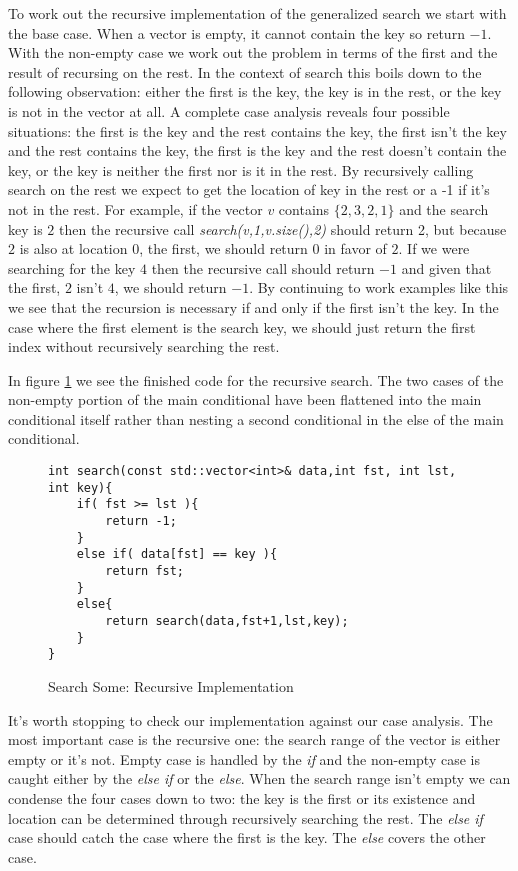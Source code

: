 \documentclass[]{tufte-handout}
\begin{document}
To work out the recursive implementation of the generalized search we start with the base case. When a vector is empty, it cannot contain the key so return $-1$. With the non-empty case we work out the problem in terms of the first and the result of recursing on the rest. In the context of search this boils down to the following observation: either the first is the key, the key is in the rest, or the key is not in the vector at all. A complete case analysis reveals four possible situations: the first is the key and the rest contains the key, the first isn't the key and the rest contains the key, the first is the key and the rest doesn't contain the key, or the key is neither the first nor is it in the rest. By recursively calling search on the rest we expect to get the location of key in the rest or a -1 if it's not in the rest.  For example, if the vector $v$ contains $\{2,3,2,1\}$ and the search key is $2$ then the recursive call \textit{search(v,1,v.size(),2)} should return 2, but because $2$ is also at location $0$, the first, we should return $0$ in favor of $2$.  If we were searching for the key $4$ then the recursive call should return $-1$ and given that the first, $2$ isn't $4$, we should return $-1$. By continuing to work examples like this we see that the recursion is necessary if and only if the first isn't the key. In the case where the first element is the search key, we should just return the first index without recursively searching the rest.

In figure \ref{code:searchrecwork} we see the finished code for the recursive search. The two cases of the non-empty portion of the main conditional have been flattened into the main conditional itself rather than nesting a second conditional in the else of the main conditional.
\begin{figure}[htpb!]
\begin{lstlisting}
int search(const std::vector<int>& data,int fst, int lst, int key){
	if( fst >= lst ){
		return -1;
	}
	else if( data[fst] == key ){
		return fst;
	}
	else{
		return search(data,fst+1,lst,key);
	}
}
\end{lstlisting}
\label{code:searchrecwork}
\caption{Search Some: Recursive Implementation}
\end{figure}

It's worth stopping to check our implementation against our case analysis. The most important case is the recursive one: the search range of the vector is either empty or it's not. Empty case is handled by the \textit{if} and the non-empty case is caught either by the \textit{else if} or the \textit{else}. When the search range isn't empty we can condense the four cases down to two: the key is the first or its existence and location can be determined through recursively searching the rest. The \textit{else if} case should catch the case where the first is the key. The \textit{else} covers the other case.
\end{document}
